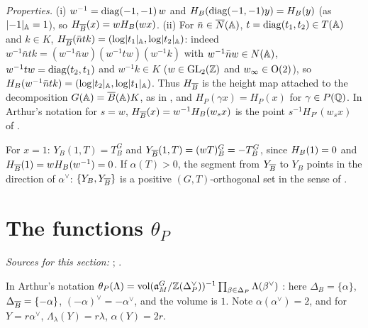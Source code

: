 \begin{definition}
\end{definition}
\noindent\emph{Properties.} (i) $w^{-1}=\operatorname{diag}(-1,-1)\,w$ and $H_B(\operatorname{diag}(-1,-1)y)=H_B(y)$ (as $\lvert-1\rvert_{\mathbb{A}}=1$), so $H_{\overline{B}}(x)=wH_B(wx)$. (ii) For
$\bar n\in\overline{N}(\mathbb{A})$, $t=\operatorname{diag}(t_1,t_2)\in T(\mathbb{A})$ and $k\in K$, $H_{\overline{B}}(\bar ntk)=(\log\lvert t_1\rvert_{\mathbb{A}},\log\lvert t_2\rvert_{\mathbb{A}})$: indeed
$w^{-1}\bar ntk=(w^{-1}\bar nw)(w^{-1}tw)(w^{-1}k)$ with $w^{-1}\bar nw\in N(\mathbb{A})$, $w^{-1}tw=\operatorname{diag}(t_2,t_1)$ and $w^{-1}k\in K$ ($w\in\mathrm{GL}_2(\mathbb{Z})$ and
$w_\infty\in\mathrm{O}(2)$), so $H_B(w^{-1}\bar ntk)=(\log\lvert t_2\rvert_{\mathbb{A}},\log\lvert t_1\rvert_{\mathbb{A}})$. Thus $H_{\overline{B}}$ is the height map attached to the decomposition
$G(\mathbb{A})=\overline{B}(\mathbb{A})K$, as in \cite[§5]{AIntro}, and $H_P(\gamma x)=H_P(x)$ for $\gamma\in P(\mathbb{Q})$. In Arthur's notation for $s=w$, $H_{\overline{B}}(x)=w^{-1}H_B(w_sx)$ is
the point $s^{-1}H_{P'}(w_sx)$ of \cite[(11.9)]{AIntro}.

\begin{definition}
\end{definition}
\noindent For $x=1$: $Y_B(1,T)=T_B^G$ and $Y_{\overline{B}}(1,T)=(wT)_B^G=-T_B^G$, since $H_B(1)=0$ and $H_{\overline{B}}(1)=wH_B(w^{-1})=0$. If $\alpha(T)>0$, the segment from
$Y_{\overline{B}}$ to $Y_B$ points in the direction of $\alpha^\vee$: $\{Y_B,Y_{\overline{B}}\}$ is a positive $(G,T)$-orthogonal set in the sense of \cite[§17, p.~95]{AIntro}.

\section{\texorpdfstring{The functions $\theta_P$}{The functions θP}}\label{sec:par-families}

\noindent\emph{Sources for this section:} \cite[§17, p.~93]{AIntro}; \cite[Lecture VII §1, Def.~1.1]{Gel}.

\begin{definition}
\end{definition}
\noindent In Arthur's notation $\theta_P(\Lambda)=\operatorname{vol}(\mathfrak a_M^G/\mathbb{Z}(\Delta_P^\vee))^{-1}\prod_{\beta\in\Delta_P}\Lambda(\beta^\vee)$ \cite[§17, p.~93]{AIntro}: here
$\Delta_B=\{\alpha\}$, $\Delta_{\overline{B}}=\{-\alpha\}$, $(-\alpha)^\vee=-\alpha^\vee$, and the volume is $1$. Note $\alpha(\alpha^\vee)=2$, and for $Y=r\alpha^\vee$,
$\Lambda_\lambda(Y)=r\lambda$, $\alpha(Y)=2r$.

